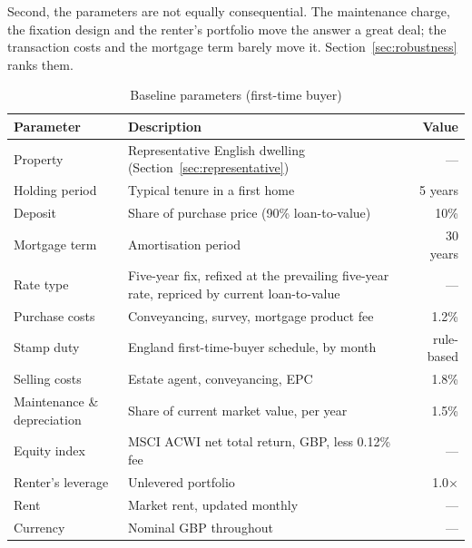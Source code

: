 Second, the parameters are not equally consequential. The maintenance charge, the fixation design and the renter's portfolio move the answer a great deal; the transaction costs and the mortgage term barely move it. Section~\ref{sec:robustness} ranks them.

\begin{table}[H]
  \centering
  \caption{Baseline parameters (first-time buyer)}
  \label{tab:assumptions}
  \begin{threeparttable}
    \begin{tabularx}{\textwidth}{@{}lXr@{}}
      \toprule
      \textbf{Parameter} & \textbf{Description} & \textbf{Value} \\
      \midrule
      Property              & Representative English dwelling (Section~\ref{sec:representative}) & --- \\
      Holding period        & Typical tenure in a first home                     & 5 years \\
      Deposit               & Share of purchase price (90\% loan-to-value)       & 10\% \\
      Mortgage term         & Amortisation period                                & 30 years \\
      Rate type             & Five-year fix, refixed at the prevailing five-year rate, repriced by current loan-to-value & --- \\
      Purchase costs        & Conveyancing, survey, mortgage product fee         & 1.2\% \\
      Stamp duty            & England first-time-buyer schedule, by month        & rule-based \\
      Selling costs         & Estate agent, conveyancing, EPC                    & 1.8\% \\
      Maintenance \& depreciation & Share of current market value, per year      & 1.5\% \\
      Equity index          & MSCI ACWI net total return, GBP, less 0.12\% fee   & --- \\
      Renter's leverage     & Unlevered portfolio                                & 1.0$\times$ \\
      Rent                  & Market rent, updated monthly                       & --- \\
      Currency              & Nominal GBP throughout                             & --- \\
      \bottomrule
    \end{tabularx}
  \end{threeparttable}
\end{table}
